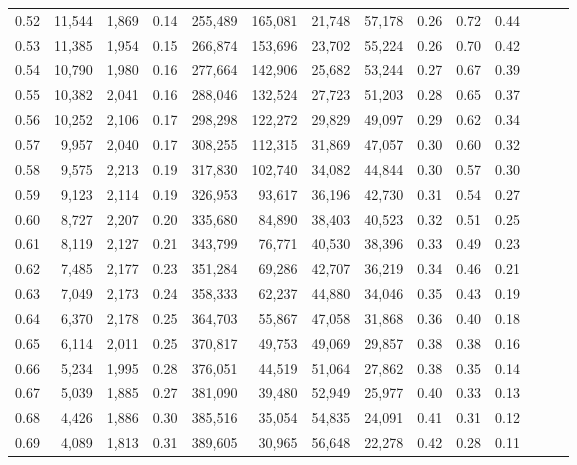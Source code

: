\begin{tabular}{rrrrrrrrrrrrrr}
0.52 &  11,544 &  1,869 &  0.14 &  255,489 &  165,081 &  21,748 &  57,178 &  0.26 &  0.72 &      0.44 \\
0.53 &  11,385 &  1,954 &  0.15 &  266,874 &  153,696 &  23,702 &  55,224 &  0.26 &  0.70 &      0.42 \\
0.54 &  10,790 &  1,980 &  0.16 &  277,664 &  142,906 &  25,682 &  53,244 &  0.27 &  0.67 &      0.39 \\
0.55 &  10,382 &  2,041 &  0.16 &  288,046 &  132,524 &  27,723 &  51,203 &  0.28 &  0.65 &      0.37 \\
0.56 &  10,252 &  2,106 &  0.17 &  298,298 &  122,272 &  29,829 &  49,097 &  0.29 &  0.62 &      0.34 \\
0.57 &   9,957 &  2,040 &  0.17 &  308,255 &  112,315 &  31,869 &  47,057 &  0.30 &  0.60 &      0.32 \\
0.58 &   9,575 &  2,213 &  0.19 &  317,830 &  102,740 &  34,082 &  44,844 &  0.30 &  0.57 &      0.30 \\
0.59 &   9,123 &  2,114 &  0.19 &  326,953 &   93,617 &  36,196 &  42,730 &  0.31 &  0.54 &      0.27 \\
0.60 &   8,727 &  2,207 &  0.20 &  335,680 &   84,890 &  38,403 &  40,523 &  0.32 &  0.51 &      0.25 \\
0.61 &   8,119 &  2,127 &  0.21 &  343,799 &   76,771 &  40,530 &  38,396 &  0.33 &  0.49 &      0.23 \\
0.62 &   7,485 &  2,177 &  0.23 &  351,284 &   69,286 &  42,707 &  36,219 &  0.34 &  0.46 &      0.21 \\
0.63 &   7,049 &  2,173 &  0.24 &  358,333 &   62,237 &  44,880 &  34,046 &  0.35 &  0.43 &      0.19 \\
0.64 &   6,370 &  2,178 &  0.25 &  364,703 &   55,867 &  47,058 &  31,868 &  0.36 &  0.40 &      0.18 \\
0.65 &   6,114 &  2,011 &  0.25 &  370,817 &   49,753 &  49,069 &  29,857 &  0.38 &  0.38 &      0.16 \\
0.66 &   5,234 &  1,995 &  0.28 &  376,051 &   44,519 &  51,064 &  27,862 &  0.38 &  0.35 &      0.14 \\
0.67 &   5,039 &  1,885 &  0.27 &  381,090 &   39,480 &  52,949 &  25,977 &  0.40 &  0.33 &      0.13 \\
0.68 &   4,426 &  1,886 &  0.30 &  385,516 &   35,054 &  54,835 &  24,091 &  0.41 &  0.31 &      0.12 \\
0.69 &   4,089 &  1,813 &  0.31 &  389,605 &   30,965 &  56,648 &  22,278 &  0.42 &  0.28 &      0.11 \\

\end{tabular}
